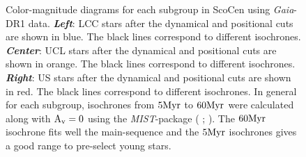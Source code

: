 \begin{figure}[!ht]
\centering
\caption{\scriptsize{Color-magnitude diagrams for each subgroup in ScoCen using \textit{Gaia}-DR1 data. \textit{\textbf{Left}}: LCC stars after the dynamical and positional cuts are shown in blue. The black lines correspond to different isochrones. \textit{\textbf{Center}}: UCL stars after the dynamical and positional cuts are shown in orange. The black lines correspond to different isochrones. \textit{\textbf{Right}}: US stars after the dynamical and positional cuts are shown in red. The black lines correspond to different isochrones. In general for each subgroup, isochrones from $5 \textnormal{Myr}$ to $60 \textnormal{Myr}$ were calculated along with $\textnormal{A}_\textnormal{v} = 0$ using the \textit{MIST}-package ( \citeyear{2016ApJS..222....8D};  \citeyear{2016ApJ...823..102C}). The $60 \textnormal{Myr}$ isochrone fits well the main-sequence and the $5 \textnormal{Myr}$ isochrones gives a good range to pre-select young stars.}}
\label{fig:Isochrones_1}
\end{figure}


